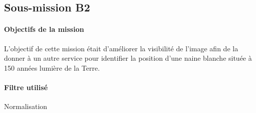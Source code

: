 \subsection{Sous-mission B2} 

	\begin{vwcol}[widths={0.8,0.2}, rule=0pt]
	\begin{minipage}{0.7\textwidth}
	\paragraph{Objectifs de la mission}

	L'objectif de cette mission était d'améliorer la visibilité de l'image afin de la donner à un autre service pour identifier la position d'une naine blanche située à 150 années lumière de la Terre.
	\end{minipage}
	\begin{minipage}{0.2\textwidth}
		\begin{flushright}
			\paragraph{Filtre utilisé}

			Normalisation\up{\ref{Normalisation}}
		\end{flushright}
	\end{minipage}
	\end{vwcol} 


